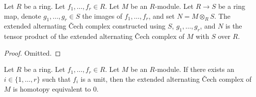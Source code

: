\begin{lemma}
\label{lemma-extended-alternating-base-change}
Let $R$ be a ring. Let $f_1, \ldots, f_r \in R$. Let $M$ be an $R$-module.
Let $R \to S$ be a ring map, denote $g_1, \ldots, g_r \in S$ the images
of $f_1, \ldots, f_r$, and set $N = M \otimes_R S$.
The extended alternating {\v C}ech complex constructed using
$S$, $g_1, \ldots, g_r$, and $N$ is the tensor product of the
extended alternating {\v C}ech complex of $M$ with $S$ over $R$.
\end{lemma}

\begin{proof}
Omitted.
\end{proof}

\begin{lemma}
\label{lemma-extended-alternating-homotopy-zero}
Let $R$ be a ring. Let $f_1, \ldots, f_r \in R$. Let $M$ be an $R$-module.
If there exists an $i \in \{1, \ldots, r\}$ such that $f_i$ is a unit, then
the extended alternating {\v C}ech
complex of $M$ is homotopy equivalent to $0$.
\end{lemma}

